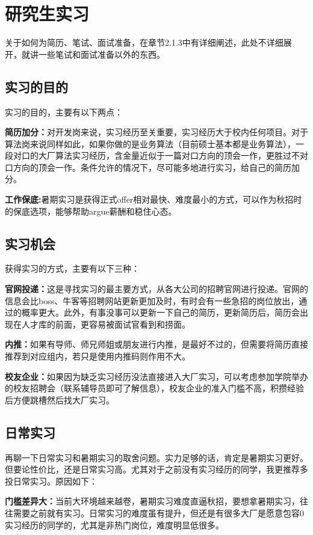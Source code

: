 \section{研究生实习}
关于如何为简历、笔试、面试准备，在章节2.1.3中有详细阐述，此处不详细展开，就讲一些笔试和面试准备以外的东西。

\subsection{实习的目的}
实习的目的，主要有以下两点：

\textbf{简历加分：}对开发岗来说，实习经历至关重要，实习经历大于校内任何项目。对于算法岗来说同样如此，如果你做的是业务算法（目前硕士基本都是业务算法），一段对口的大厂算法实习经历，含金量近似于一篇对口方向的顶会一作，更胜过不对口方向的顶会一作。条件允许的情况下，尽可能多地进行实习，给自己的简历加分。

\textbf{工作保底:}暑期实习是获得正式offer相对最快、难度最小的方式，可以作为秋招时的保底选项，能够帮助argue薪酬和稳住心态。

\subsection{实习机会}
获得实习的方式，主要有以下三种：

\textbf{官网投递：}这是寻找实习的最主要方式，从各大公司的招聘官网进行投递。官网的信息会比boss、牛客等招聘网站更新更加及时，有时会有一些急招的岗位放出，通过的概率更大。此外，有事没事可以更新一下自己的简历，更新简历后，简历会出现在人才库的前面，更容易被面试官看到和捞面。

\textbf{内推：}如果有导师、师兄师姐或朋友进行内推，是最好不过的，但需要将简历直接推荐到对应组内，若只是使用内推码则作用不大。

\textbf{校友企业：}如果因为缺乏实习经历没法直接进入大厂实习，可以考虑参加学院举办的校友招聘会（联系辅导员即可了解信息），校友企业的准入门槛不高，积攒经验后方便跳槽然后找大厂实习。

\subsection{日常实习}

再聊一下日常实习和暑期实习的取舍问题。实力足够的话，肯定是暑期实习更好。但要论性价比，还是日常实习高。尤其对于之前没有实习经历的同学，我更推荐多投日常实习。原因如下：

\textbf{门槛差异大：}当前大环境越来越卷，暑期实习难度直逼秋招，要想拿暑期实习，往往需要之前就有实习。日常实习的难度虽有提升，但还是有很多大厂是愿意包容0实习经历的同学的，尤其是非热门岗位，难度明显低很多。

